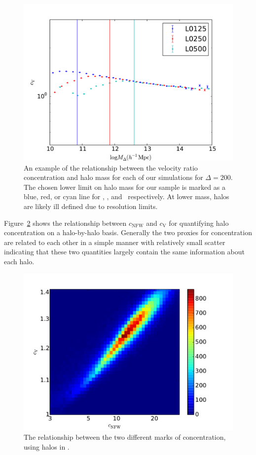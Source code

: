 \documentclass[usenatbib,usegraphicx,letterpaper]{mn2e}
\begin{document}
\begin{figure}
\centering
\includegraphics[width=.5\textwidth]{masscut_cV_d200.pdf}
\caption{An example of the relationship between the velocity ratio concentration and halo mass for each of our simulations for $\Delta =200$. The chosen lower limit on halo mass for our sample is marked as a blue, red, or cyan line for \simA, \simB, and \simC \ respectively. At lower mass, halos are likely ill defined due to resolution limits.}
\label{fig:cvrelation}
\end{figure}

Figure~\ref{fig:concentrations} shows the relationship between $c_{\mathrm{NFW}}$ and $c_{\mathrm{V}}$ for quantifying halo 
concentration on a halo-by-halo basis. Generally the two proxies for concentration are related to each other in a simple manner 
with relatively small scatter indicating that these two quantities largely contain the same information about each halo.

\begin{figure}
\centering
\includegraphics[width=.5\textwidth]{L0250_compare_cnfwvcV_z00.pdf}
\caption{
The relationship between the two different marks of concentration, using halos in \simB. 
}
\label{fig:concentrations}
\end{figure}
\end{document}
